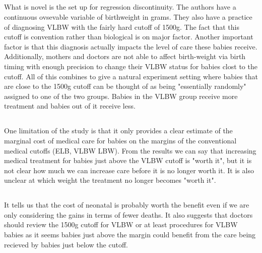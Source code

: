 \documentclass[11pt]{article}
\begin{document}
\subsection{}
What is novel is the set up for regression discontinuity. The authors have a continuous ovsevable variable of birthweight in grams. They also have a practice of diagnosing VLBW with the fairly hard cutoff of 1500g. The fact that this cutoff is convention rather than biological is on major factor. Another important factor is that this diagnosis actually impacts the level of care these babies receive. Additionally, mothers and doctors are not able to affect birth-weight via birth timing with enough precision to change their VLBW status for babies clost to the cutoff. All of this combines to give a natural experiment setting where babies that are close to the 1500g cutoff can be thought of as being "essentially randomly" assigned to one of the two groups. Babies in the VLBW group receive more treatment and babies out of it receive less.

\subsection{}

One limitation of the study is that it only provides a clear estimate of the marginal cost of medical care for babies on the margins of the conventional medical cutoffs (ELB, VLBW LBW). From the results we can say that increasing medical treatment for babies just above the VLBW cutoff is "worth it", but it is not clear how much we can increase care before it is no longer worth it. It is also unclear at which weight the treatment no longer becomes "worth it". 

\subsection{}
It tells us that the cost of neonatal is probably worth the benefit even if we are only considering the gains in terms of fewer deaths. It also suggests that doctors should review the 1500g cutoff for VLBW or at least procedures for VLBW babies as it seems babies just above the margin could benefit from the care being recieved by babies just below the cutoff. 




\end{document}
